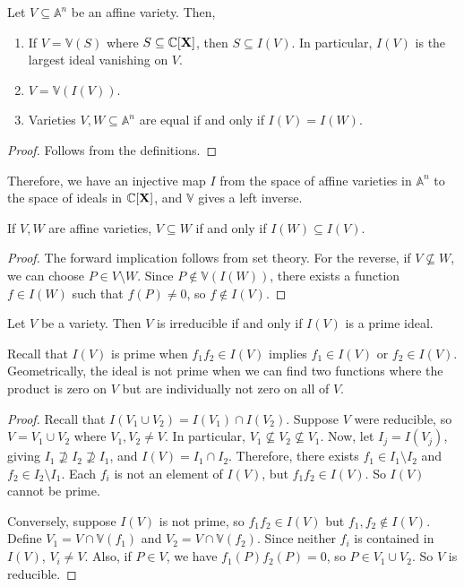\begin{proposition}
    Let \( V \subseteq \mathbb A^n \) be an affine variety.
    Then,
    \begin{enumerate}
        \item If \( V = \mathbb V(S) \) where \( S \subseteq \mathbb C[\vb X] \), then \( S \subseteq I(V) \).
        In particular, \( I(V) \) is the largest ideal vanishing on \( V \).
        \item \( V = \mathbb V(I(V)) \).
        \item Varieties \( V, W \subseteq \mathbb A^n \) are equal if and only if \( I(V) = I(W) \).
    \end{enumerate}
\end{proposition}
\begin{proof}
    Follows from the definitions.
\end{proof}
Therefore, we have an injective map \( I \) from the space of affine varieties in \( \mathbb A^n \) to the space of ideals in \( \mathbb C[\vb X] \), and \( \mathbb V \) gives a left inverse.
\begin{proposition}
    If \( V, W \) are affine varieties, \( V \subseteq W \) if and only if \( I(W) \subseteq I(V) \).
\end{proposition}
\begin{proof}
    The forward implication follows from set theory.
    For the reverse, if \( V \not\subseteq W \), we can choose \( P \in V \setminus W \).
    Since \( P \not\in \mathbb V(I(W)) \), there exists a function \( f \in I(W) \) such that \( f(P) \neq 0 \), so \( f \not\in I(V) \).
\end{proof}
\begin{proposition}
    Let \( V \) be a variety.
    Then \( V \) is irreducible if and only if \( I(V) \) is a prime ideal.
\end{proposition}
Recall that \( I(V) \) is prime when \( f_1 f_2 \in I(V) \) implies \( f_1 \in I(V) \) or \( f_2 \in I(V) \).
Geometrically, the ideal is not prime when we can find two functions where the product is zero on \( V \) but are individually not zero on all of \( V \).
\begin{proof}
    Recall that \( I(V_1 \cup V_2) = I(V_1) \cap I(V_2) \).
    Suppose \( V \) were reducible, so \( V = V_1 \cup V_2 \) where \( V_1, V_2 \neq V \).
    In particular, \( V_1 \not\subseteq V_2 \not\subseteq V_1 \).
    Now, let \( I_j = I(V_j) \), giving \( I_1 \not\supseteq I_2 \not\supseteq I_1 \), and \( I(V) = I_1 \cap I_2 \).
    Therefore, there exists \( f_1 \in I_1 \setminus I_2 \) and \( f_2 \in I_2 \setminus I_1 \).
    Each \( f_i \) is not an element of \( I(V) \), but \( f_1 f_2 \in I(V) \).
    So \( I(V) \) cannot be prime.

    Conversely, suppose \( I(V) \) is not prime, so \( f_1 f_2 \in I(V) \) but \( f_1, f_2 \not\in I(V) \).
    Define \( V_1 = V \cap \mathbb V(f_1) \) and \( V_2 = V \cap \mathbb V(f_2) \).
    Since neither \( f_i \) is contained in \( I(V) \), \( V_i \neq V \).
    Also, if \( P \in V \), we have \( f_1(P) f_2(P) = 0 \), so \( P \in V_1 \cup V_2 \).
    So \( V \) is reducible.
\end{proof}
